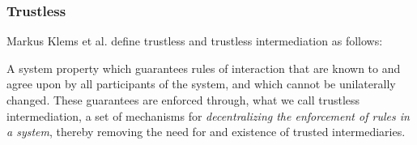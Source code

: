 %

\subsubsection{Trustless}

Markus Klems et al. define trustless and trustless intermediation as follows:

\begin{displayquote}
   A system property which guarantees rules of interaction that are known to and agree upon by all participants of the system, and which cannot be unilaterally changed. These guarantees are enforced through, what we call trustless intermediation, a set of mechanisms for \textit{decentralizing the enforcement of rules in a system}, thereby removing the need for and existence of trusted intermediaries. \cite{trustlessIntermediationInBCServiceMarket}
\end{displayquote}

